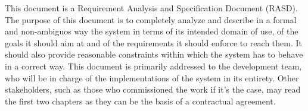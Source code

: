 This document is a Requirement Analysis and Specification Document (RASD).
The purpose of this document is to completely analyze and describe in a formal and non-ambiguos way the system in terms of its intended domain of use, of the goals it should aim at and of the requirements it should enforce to reach them. It should also provide reasonable constraints within which the system has to behave in a correct way.
This document is primarily addressed to the development team, who will be in charge of the implementations of the system in its entirety. Other stakeholders, such as those who commissioned the work if it's the case, may read the first two chapters as they can be the basis of a contractual agreement.